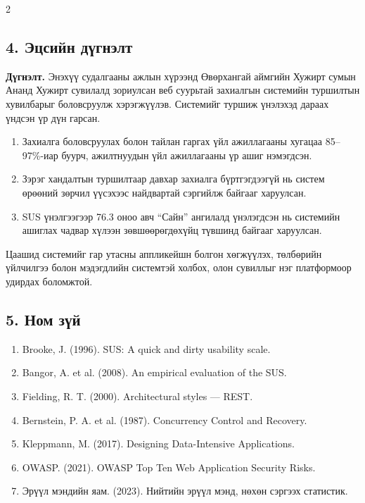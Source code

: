 \begin{multicols}{2}
\subsection*{4. Эцсийн дүгнэлт}

\textbf{Дүгнэлт.} Энэхүү судалгааны ажлын хүрээнд Өвөрхангай аймгийн Хужирт сумын Ананд Хужирт сувилалд зориулсан веб суурьтай захиалгын системийн туршилтын хувилбарыг боловсруулж хэрэгжүүлэв. Системийг туршиж үнэлэхэд дараах үндсэн үр дүн гарсан.

\begin{enumerate}[leftmargin=1.4em, itemsep=1pt]
  \item Захиалга боловсруулах болон тайлан гаргах үйл ажиллагааны хугацаа 85--97\%-иар буурч, ажилтнуудын үйл ажиллагааны үр ашиг нэмэгдсэн.
  \item Зэрэг хандалтын туршилтаар давхар захиалга бүртгэгдээгүй нь систем өрөөний зөрчил үүсэхээс найдвартай сэргийлж байгааг харуулсан.
  \item SUS үнэлгээгээр 76.3 оноо авч ``Сайн'' ангилалд үнэлэгдсэн нь системийн ашиглах чадвар хүлээн зөвшөөрөгдөхүйц түвшинд байгааг харуулсан.
\end{enumerate}

Цаашид системийг гар утасны аппликейшн болгон хөгжүүлэх, төлбөрийн үйлчилгээ болон мэдэгдлийн системтэй холбох, олон сувиллыг нэг платформоор удирдах боломжтой.
\subsection*{5. Ном зүй}

\begin{enumerate}[leftmargin=1.2em, itemsep=1pt, label={\arabic*.}]
  \item \small Brooke, J. (1996). SUS: A quick and dirty usability scale.
  \item \small Bangor, A. et al. (2008). An empirical evaluation of the SUS.
  \item \small Fielding, R. T. (2000). Architectural styles --- REST.
  \item \small Bernstein, P. A. et al. (1987). Concurrency Control and Recovery.
  \item \small Kleppmann, M. (2017). Designing Data-Intensive Applications.
  \item \small OWASP. (2021). OWASP Top Ten Web Application Security Risks.
  \item \small Эрүүл мэндийн яам. (2023). Нийтийн эрүүл мэнд, нөхөн сэргээх статистик.
\end{enumerate}

\end{multicols}
